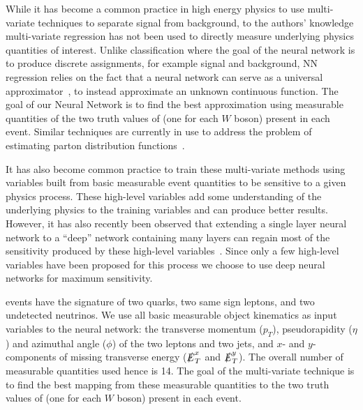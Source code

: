 While it has become a common practice in high energy physics to use
multi-variate techniques to separate signal from background, to the
authors' knowledge multi-variate regression has not been used to
directly measure underlying physics quantities of interest. Unlike
classification where the goal of the neural network is to produce
discrete assignments, for example signal and background, NN regression
relies on the fact that a neural network can serve as a universal
approximator~\cite{NN_1}, to instead approximate an unknown continuous
function.  The goal of our Neural Network is to find the best
approximation using measurable quantities of the two truth values
of \cts (one for each $W$ boson) present in each event. Similar
techniques are currently in use to address the problem of estimating
parton distribution functions~\cite{NNPDF}.

It has also become common practice to train these multi-variate
methods using variables built from basic measurable event quantities
to be sensitive to a given physics process. These high-level variables
add some understanding of the underlying physics to the training
variables and can produce better results. However, it has also
recently been observed that extending a single layer neural network to
a ``deep'' network containing many layers can regain most of the
sensitivity produced by these high-level
variables~\cite{Baldi:2014kfa,Baldi:2014pta}. Since only a few
high-level variables have been proposed for this process we choose to
use deep neural networks for maximum sensitivity.

\ssWW events have the signature of two quarks, two same sign leptons, and
two undetected neutrinos.  We use all basic measurable object
kinematics as input variables to the neural network: the transverse
momentum ($p_T$), pseudorapidity ($\eta$) and azimuthal angle ($\phi$)
of the two leptons and two jets, and $x$- and $y$-components of
missing transverse energy ($\slashed{E}_T^x$ and $\slashed{E}_T^y$).
The overall number of measurable quantities used hence is 14. The
goal of the multi-variate technique is to find the best mapping from
these measurable quantities to the two truth values of \cts (one for
each $W$ boson) present in each event.

